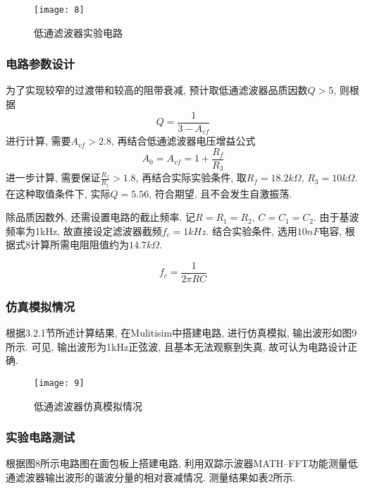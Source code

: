 \documentclass[UTF2]{ctexart}
\begin{document}
	\begin{figure}[h]
		\centering
		\texttt{[image: 8]}
		\caption{低通滤波器实验电路}
	\end{figure}
	
	\subsubsection{电路参数设计}
	
	为了实现较窄的过渡带和较高的阻带衰减, 预计取低通滤波器品质因数$Q > 5$, 则根据
	\begin{equation}
		Q = \frac{1}{3 - A_{vf}}
	\end{equation}
	进行计算, 需要$A_{vf} > 2.8$, 再结合低通滤波器电压增益公式
	\begin{equation}
		A_0 = A_{vf} = 1 + \frac{ R_f }{ R_3 }
	\end{equation}
	进一步计算, 需要保证$\frac{R_f }{ R_1} > 1.8$, 再结合实际实验条件, 取$R_f = 18.2k\Omega$, $R_3 = 10k \Omega$. 在这种取值条件下, 实际$Q = 5.56$, 符合期望, 且不会发生自激振荡.
	
	除品质因数外, 还需设置电路的截止频率. 记$R = R_1 = R_2$, $C = C_1 = C_2$. 由于基波频率为1kHz, 故直接设定滤波器截频$f_c = 1kHz$. 结合实验条件, 选用$10nF$电容, 根据式8计算所需电阻阻值约为$14.7k \Omega$.

	\begin{equation}
		f_c = \frac{1}{2 \pi RC}
	\end{equation}
	
	\subsubsection{仿真模拟情况}
	
	根据3.2.1节所述计算结果, 在Mulitisim中搭建电路, 进行仿真模拟, 输出波形如图9所示. 可见, 输出波形为1kHz正弦波, 且基本无法观察到失真, 故可认为电路设计正确.
	
	\begin{figure}[h]
		\centering
		\texttt{[image: 9]}
		\caption{低通滤波器仿真模拟情况}
	\end{figure}
	
	\subsubsection{实验电路测试}
	
	根据图8所示电路图在面包板上搭建电路, 利用双踪示波器MATH--FFT功能测量低通滤波器输出波形的谐波分量的相对衰减情况. 测量结果如表2所示.
	
\end{document}
